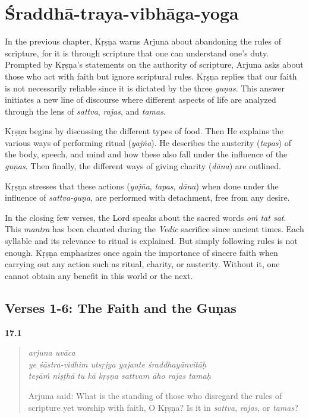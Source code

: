 \chapter{Śraddhā-traya-vibhāga-yoga}\label{chap-sraddha-traya-vibhaga-yoga}

\noindent In the previous chapter, Kṛṣṇa warns Arjuna about abandoning the rules of scripture, for it is through scripture that one can understand one’s duty. Prompted by Kṛṣṇa's statements on the authority of scripture, Arjuna asks about those who act with faith but ignore scriptural rules. Kṛṣṇa replies that our faith is not necessarily reliable since it is dictated by the three \textit{guṇas}. This answer initiates a new line of discourse where different aspects of life are analyzed through the lens of \textit{sattva}, \textit{rajas}, and \textit{tamas}.

Kṛṣṇa begins by discussing the different types of food. Then He explains the various ways of performing ritual (\textit{yajña}). He describes the austerity (\textit{tapas}) of the body, speech, and mind and how these also fall under the influence of the \textit{guṇas}. Then finally, the different ways of giving charity (\textit{dāna}) are outlined.

Kṛṣṇa stresses that these actions (\textit{yajña}, \textit{tapas}, \textit{dāna}) when done under the influence of \textit{sattva-guṇa}, are performed with detachment, free from any desire.

In the closing few verses, the Lord speaks about the sacred words \textit{oṁ tat sat}. This \textit{mantra} has been chanted during the \textit{Vedic} sacrifice since ancient times. Each syllable and its relevance to ritual is explained. But simply following rules is not enough. Kṛṣṇa emphasizes once again the importance of sincere faith when carrying out any action such as ritual, charity, or austerity. Without it, one cannot obtain any benefit in this world or the next.

\section{Verses 1-6: The Faith and the Guṇas}\label{sec-verses-1-6-the-faith-and-the-gunas}


\par\noindent\textbf{17.1}\par
\begin{verse}
\textit{arjuna uvāca} \\
\textit{ye śāstra-vidhim utsṛjya yajante śraddhayānvitāḥ} \\
\textit{teṣāṁ niṣṭhā tu kā kṛṣṇa sattvam āho rajas tamaḥ}

\noindent Arjuna said: What is the standing of those who disregard the rules of scripture yet worship with faith, O Kṛṣṇa? Is it in \textit{sattva}, \textit{rajas}, or \textit{tamas}?
\end{verse}
\par



